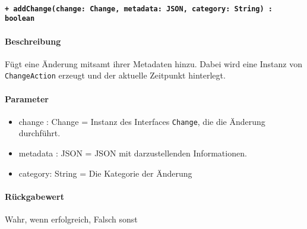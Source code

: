 \paragraph{\texttt{+ addChange(change: Change, metadata: JSON, category: String) : boolean}}%
\paragraph*{Beschreibung}
Fügt eine Änderung mitsamt ihrer Metadaten hinzu.
Dabei wird eine Instanz von \verb#ChangeAction# erzeugt und der aktuelle Zeitpunkt hinterlegt.
\paragraph*{Parameter}
\begin{itemize}
    \item change : Change = Instanz des Interfaces \verb#Change#, die die Änderung durchführt.
    \item metadata : JSON = JSON mit darzustellenden Informationen.
    \item category: String = Die Kategorie der Änderung
\end{itemize}
\paragraph*{Rückgabewert}
Wahr, wenn erfolgreich, Falsch sonst
